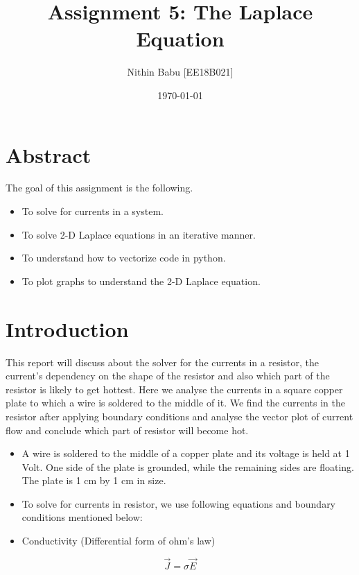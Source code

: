 \documentclass[11pt, a4paper]{article}
\title{Assignment 5: The Laplace Equation} %
\author{Nithin Babu [EE18B021]} %
\date{\today} %
\begin{document}
	
\lstset{language=Python}
	
\maketitle %
  \section*{Abstract}
  The goal of this assignment is the following.
  \begin{itemize}
  \item
  	To solve for currents in a system.
  \item
  	To solve 2-D Laplace equations in an iterative manner.
  \item
	To understand how to vectorize code in python.
  \item
	To plot graphs to understand the 2-D Laplace equation.	
\end{itemize}  	
  
  \section{Introduction}
  This report will discuss about the solver for the currents in a
resistor, the current's dependency on the shape of
the resistor and also which part of the resistor is likely to
get hottest. Here we analyse the currents in a square copper plate to
which a wire is soldered to the middle of it. We find the
currents in the resistor after applying boundary conditions and analyse
the vector plot of current flow and conclude which part of resistor will
become hot.

	\begin{itemize}
    \item
      A wire is soldered to the middle of a copper plate and its voltage is
      held at 1 Volt. One side of the plate is grounded, while the remaining 		  sides are floating. The plate is 1 cm by 1 cm in size.
    \item
      To solve for currents in resistor, we use following equations and
      boundary conditions mentioned below:
    \item
      Conductivity (Differential form of ohm's law)
    \end{itemize}
    
    \begin{equation}
    \vec{J} = \sigma\vec{E}
       \end{equation}
    
\end{document}
